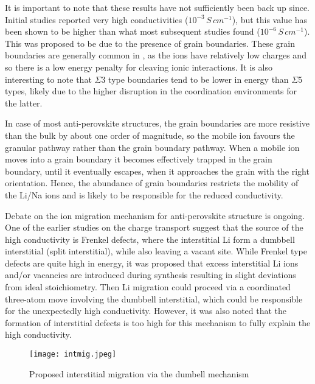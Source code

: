 \documentclass[10pt,a4paper, titlepage]{article}
\begin{document}
It is important to note that these results have not sufficiently been back up since. 
Initial studies reported very high conductivities ($10^{-3} \,S \, cm^{-1}$)\cite{RN51, RN52}, but this value has been shown to be higher than what most subsequent studies found ($10^{-6} \, S \, cm^{-1}$). \cite{RN58}
This was proposed to be due to the presence of grain boundaries. 
These grain boundaries are generally common in , as the ions have relatively low charges and so there is a low energy penalty for cleaving ionic interactions. 
It is also interesting to note that $ \Sigma $3 type boundaries tend to be lower in energy than $ \Sigma$5 types, likely due to the higher disruption in the coordination environments for the latter. \cite{RN59}  

In case of most anti-perovskite structures, the grain boundaries are more resistive than the bulk by about one order of magnitude, so the mobile ion favours the granular pathway rather than the grain boundary pathway. 
When a mobile ion moves into a grain boundary it becomes effectively trapped in the grain boundary, until it eventually escapes, when it approaches the grain with the right orientation. 
Hence, the abundance of grain boundaries restricts the mobility of the Li/Na ions and is likely to be responsible for the reduced conductivity. \cite{RN59}

Debate on the ion migration mechanism for anti-perovskite structure is ongoing. 
One of the earlier studies on the charge transport suggest that the source of the high conductivity is Frenkel defects, where the interstitial Li form a dumbbell interstitial (split interstitial), while also leaving a vacant site. 
While Frenkel type defects are quite high in energy, it was proposed that excess interstitial Li ions and/or vacancies are introduced during synthesis resulting in slight deviations from ideal  stoichiometry. 
Then Li migration could proceed via a coordinated three-atom move involving the dumbbell interstitial, which could be responsible for the unexpectedly high conductivity. 
However, it was also noted that the formation of interstitial defects is too high for this mechanism to fully explain the high conductivity. \cite{RN2} 

\begin{figure}
\centering
\texttt{[image: intmig.jpeg]}
\caption{\label{intmig.jpeg} Proposed interstitial migration via the dumbell mechanism \citep{RN2}}
\end{figure}
\end{document}
